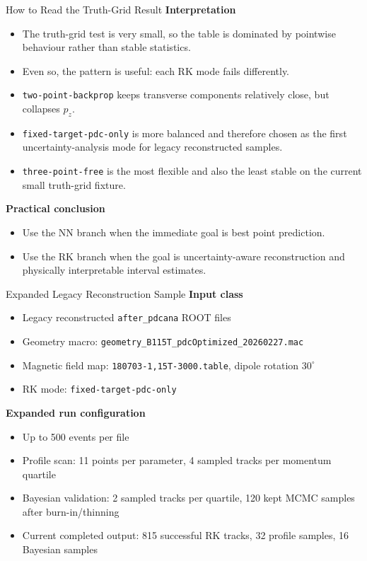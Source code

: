 \documentclass[aspectratio=169]{beamer}
\begin{document}
\begin{frame}{How to Read the Truth-Grid Result}
\small
\textbf{Interpretation}
\begin{itemize}
\item The truth-grid test is very small, so the table is dominated by pointwise behaviour rather than stable statistics.
\item Even so, the pattern is useful: each RK mode fails differently.
\item \texttt{two-point-backprop} keeps transverse components relatively close, but collapses \(p_z\).
\item \texttt{fixed-target-pdc-only} is more balanced and therefore chosen as the first uncertainty-analysis mode for legacy reconstructed samples.
\item \texttt{three-point-free} is the most flexible and also the least stable on the current small truth-grid fixture.
\end{itemize}

\vspace{0.2cm}
\textbf{Practical conclusion}
\begin{itemize}
\item Use the NN branch when the immediate goal is best point prediction.
\item Use the RK branch when the goal is uncertainty-aware reconstruction and physically interpretable interval estimates.
\end{itemize}
\end{frame}

\begin{frame}{Expanded Legacy Reconstruction Sample}
\scriptsize
\textbf{Input class}
\begin{itemize}
\item Legacy reconstructed \texttt{after\_pdcana} ROOT files
\item Geometry macro: \texttt{geometry\_B115T\_pdcOptimized\_20260227.mac}
\item Magnetic field map: \texttt{180703-1,15T-3000.table}, dipole rotation \(30^\circ\)
\item RK mode: \texttt{fixed-target-pdc-only}
\end{itemize}

\vspace{0.1cm}
\textbf{Expanded run configuration}
\begin{itemize}
\item Up to 500 events per file
\item Profile scan: 11 points per parameter, 4 sampled tracks per momentum quartile
\item Bayesian validation: 2 sampled tracks per quartile, 120 kept MCMC samples after burn-in/thinning
\item Current completed output: 815 successful RK tracks, 32 profile samples, 16 Bayesian samples
\end{itemize}
\end{frame}
\end{document}
